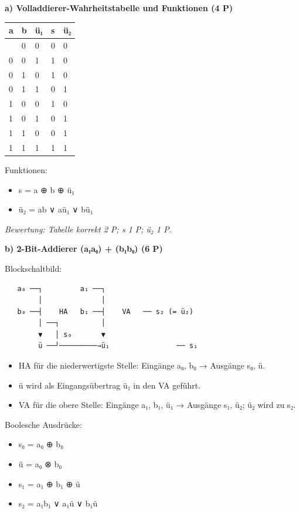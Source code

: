 \documentclass[11pt, a4paper]{article}
\begin{document}
\textbf{a) Volladdierer-Wahrheitstabelle und Funktionen (4 P)}



{\small
\begin{tabularx}{\linewidth}{XXXXX}
\hline
\rowcolor{tableheadbg}
{\color{white}\textbf{a}} & {\color{white}\textbf{b}} & {\color{white}\textbf{ü₁}} & {\color{white}\textbf{s}} & {\color{white}\textbf{ü₂}} \\[2pt]
\hline
\endhead
\hline
\endfoot
0 & 0 & 0 & 0 & 0 \\
0 & 0 & 1 & 1 & 0 \\
0 & 1 & 0 & 1 & 0 \\
0 & 1 & 1 & 0 & 1 \\
1 & 0 & 0 & 1 & 0 \\
1 & 0 & 1 & 0 & 1 \\
1 & 1 & 0 & 0 & 1 \\
1 & 1 & 1 & 1 & 1 \\
\end{tabularx}
}


Funktionen:

\begin{itemize}
  \item s = a ⊕ b ⊕ ü₁
  \item ü₂ = ab ∨ aü₁ ∨ bü₁
\end{itemize}

\textit{Bewertung: Tabelle korrekt 2 P; s 1 P; ü₂ 1 P.}


\textbf{b) 2-Bit-Addierer (a₁a₀) + (b₁b₀) (6 P)}


Blockschaltbild:


\begin{lstlisting}
   a₀ ──┐         a₁ ──┐
        │              │
   b₀ ──┤    HA   b₁ ──┤    VA   ── s₂ (= ü₂)
        │ ──┐          │
        ▼   │ s₀       ▼
        ü ──┘─────────→ü₁                ── s₁
\end{lstlisting}


\begin{itemize}
  \item HA für die niederwertigste Stelle: Eingänge a₀, b₀ → Ausgänge s₀, ü.
  \item ü wird als Eingangsübertrag ü₁ in den VA geführt.
  \item VA für die obere Stelle: Eingänge a₁, b₁, ü₁ → Ausgänge s₁, ü₂; ü₂ wird zu s₂.
\end{itemize}

Boolesche Ausdrücke:

\begin{itemize}
  \item s₀ = a₀ ⊕ b₀
  \item ü = a₀ ⊗ b₀
  \item s₁ = a₁ ⊕ b₁ ⊕ ü
  \item s₂ = a₁b₁ ∨ a₁ü ∨ b₁ü
\end{itemize}
\end{document}
